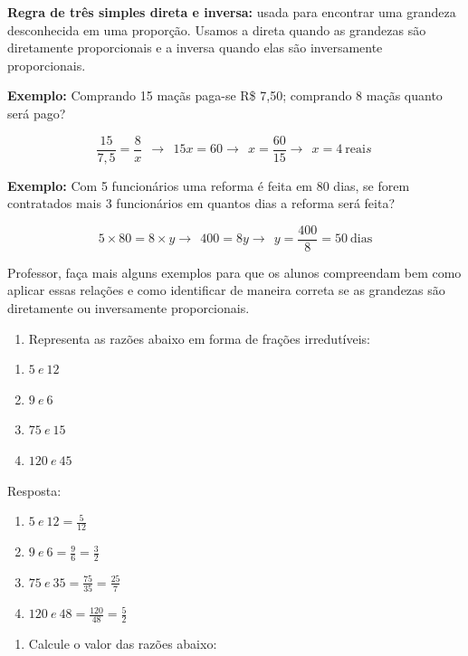 \textbf{{Regra de três simples direta e inversa:}} usada para encontrar
uma grandeza desconhecida em uma proporção. Usamos a direta quando as
grandezas são diretamente proporcionais e a inversa quando elas são
inversamente proporcionais.

\textbf{Exemplo:} Comprando 15 maçãs paga-se R\$ 7,50; comprando 8 maçãs
quanto será pago?

\[\frac{15}{7,5} = \frac{8}{x}\ \  \rightarrow \ \ 15x = 60 \rightarrow \ \ x = \frac{60}{15} \rightarrow \ \ x = 4\ \text{reai}s\ \]

\textbf{Exemplo:} Com 5 funcionários uma reforma é feita em 80 dias, se
forem contratados mais 3 funcionários em quantos dias a reforma será
feita?

\[5 \times 80 = 8 \times y \rightarrow \ \ 400 = 8y \rightarrow \ \ y = \frac{400}{8} = 50\ \text{dias}\]

Professor, faça mais alguns exemplos para que os alunos compreendam bem
como aplicar essas relações e como identificar de maneira correta se as
grandezas são diretamente ou inversamente proporcionais.


\begin{enumerate}
\def\labelenumi{\arabic{enumi})}
\tightlist
\item
  Representa as razões abaixo em forma de frações irredutíveis:
\end{enumerate}

\begin{enumerate}
\def\labelenumi{\alph{enumi})}
\item
  \(5\ e\ 12\)
\item
  \(9\ e\ 6\)
\item
  \(75\ e\ 15\)
\item
  \(120\ e\ 45\)
\end{enumerate}

Resposta:

\begin{enumerate}
\def\labelenumi{\alph{enumi})}
\item
  \(5\ e\ 12 = \frac{5}{12}\)
\item
  \(9\ e\ 6 = \frac{9}{6} = \frac{3}{2}\)
\item
  \(75\ e\ 35 = \frac{75}{35} = \frac{25}{7}\)
\item
  \(120\ e\ 48 = \frac{120}{48} = \frac{5}{2}\ \)
\end{enumerate}

\begin{enumerate}
\def\labelenumi{\arabic{enumi})}
\setcounter{enumi}{1}
\tightlist
\item
  Calcule o valor das razões abaixo:
\end{enumerate}

